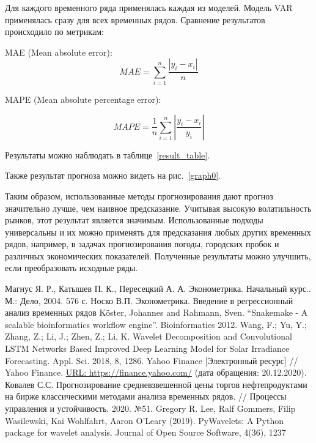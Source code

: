 \documentclass[a4paper,article,14pt]{extarticle}
\begin{document}



Для каждого временного ряда применялась каждая из моделей.
Модель VAR применялась сразу для всех временных рядов.
Сравнение результатов происходило по метрикам:

MAE (Mean absolute error):
\begin{equation}
    MAE = \sum_{i=1}^{n} \frac{|y_i - x_i|}{n}\label{eq:mae}
\end{equation}

MAPE (Mean absolute percentage error):

\begin{equation}
    MAPE = \frac{1}{n} \sum_{i=1}^{n} \left| \frac{y_i - x_i}{y_i} \right|\label{eq:mape}
\end{equation}

\begin{comment}
RMSE (Root mean square error)
\begin{equation}
    RMSE = \sqrt{\sum_{i=1}^{n} \frac{(x_i - y_i) ^ 2}{n}}\label{eq:rmse}
\end{equation}
\end{comment}

Результаты можно наблюдать в таблице~\ref{result_table}.


Также результат прогноза можно видеть  на рис.~\ref{graph0}.


Таким образом, использованные методы прогнозирования дают прогноз значительно лучше, чем наивное предсказание.
Учитывая высокую волатильность рынков, этот результат является значимым.
Использованные подходы универсальны и их можно применять для предсказания любых других временных рядов, например, в задачах прогнозирования погоды, городских пробок и различных экономических показателей.
Полученные результаты можно улучшить, если преобразовать исходные ряды.

\begin{thebibliography}{1}
 Магнус Я. Р., Катышев П. К., Пересецкий А. А. Эконометрика. Начальный курс.. М.: Дело, 2004. 576 с.
 Носко В.П. Эконометрика. Введение в регрессионный анализ временных рядов
 Köster, Johannes and Rahmann, Sven. “Snakemake - A scalable bioinformatics workflow engine”. Bioinformatics 2012.
 Wang, F.; Yu, Y.; Zhang, Z.; Li, J.; Zhen, Z.; Li, K. Wavelet Decomposition and Convolutional LSTM Networks Based Improved Deep Learning Model for Solar Irradiance Forecasting. Appl. Sci. 2018, 8, 1286.
 Yahoo Finance [Электронный ресурс] // Yahoo Finance. \url{URL:  https://finance.yahoo.com/} (дата обращения: 20.12.2020).
 Ковалев С.С. Прогнозирование средневзвешенной цены торгов нефтепродуктами на бирже классическими методами анализа временных рядов. // Процессы управления и устойчивость. 2020. №51.
 Gregory R. Lee, Ralf Gommers, Filip Wasilewski, Kai Wohlfahrt, Aaron O’Leary (2019). PyWavelets: A Python package for wavelet analysis. Journal of Open Source Software, 4(36), 1237
\end{thebibliography}
\end{document}
